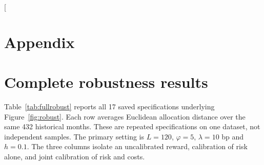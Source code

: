\documentclass[sigconf,anonymous,review]{acmart}
\begin{document}


\appendix
\twocolumn[{
\section*{Appendix}
\section{Complete robustness results}\label{app:robustness}
Table~\ref{tab:fullrobust} reports all 17 saved specifications underlying Figure~\ref{fig:robust}. Each row averages Euclidean allocation distance over the same 432 historical months. These are repeated specifications on one dataset, not independent samples. The primary setting is $L=120$, $\varphi=5$, $\lambda=10$ bp and $h=0.1$. The three columns isolate an uncalibrated reward, calibration of risk alone, and joint calibration of risk and costs.

}
\end{document}
